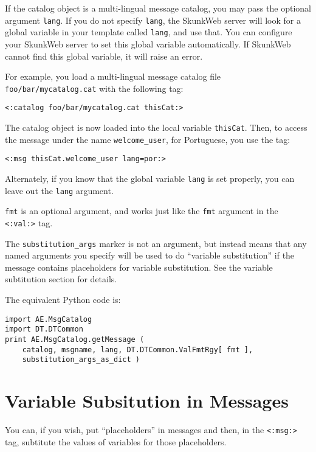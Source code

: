 \documentclass{manual}
\begin{document}
If the catalog object is a multi-lingual message catalog,
you may pass the optional argument \texttt{lang}.
If you do not specify \texttt{lang},
the SkunkWeb server will look for a global variable in your template
called \texttt{lang}, and use that.  You can configure your SkunkWeb
server to set this global variable automatically.  If SkunkWeb cannot
find this global variable, it will raise an error.

For example, you load a multi-lingual message catalog file
\texttt{foo/bar/mycatalog.cat} with the following tag:

\begin{verbatim}
<:catalog foo/bar/mycatalog.cat thisCat:>
\end{verbatim}


The catalog object is now loaded into the local variable
\texttt{thisCat}. Then, to access the message under the name
\texttt{welcome_user}, for Portuguese, you use the tag:

\begin{verbatim}
<:msg thisCat.welcome_user lang=por:>
\end{verbatim}

Alternately, if you know that the global variable \texttt{lang}
is set properly, you can leave out the \texttt{lang} argument.

\texttt{fmt} is an optional argument, and works just like 
the \texttt{fmt} argument in the 
\texttt{<:val:>} 
tag.

The \texttt{substitution_args} marker is not an argument, but instead
means that any named arguments you specify will be used to do
``variable substitution'' if the message contains placeholders
for variable substitution. See the 
variable subtitution 
section for details.

The equivalent Python code is:
\begin{verbatim}
import AE.MsgCatalog
import DT.DTCommon
print AE.MsgCatalog.getMessage ( 
    catalog, msgname, lang, DT.DTCommon.ValFmtRgy[ fmt ], 
    substitution_args_as_dict )
\end{verbatim}


\section{Variable Subsitution in Messages}
\label{msgcatvarsub}

You can, if you wish, put ``placeholders'' in
messages and then, in the 
\texttt{<:msg:>} 
tag, subtitute the values of variables for those
placeholders.
\end{document}
